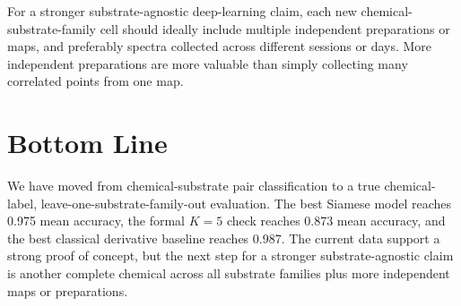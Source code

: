 \documentclass[11pt]{article}
\begin{document}
For a stronger substrate-agnostic deep-learning claim, each new chemical-substrate-family cell should ideally include multiple independent preparations or maps, and preferably spectra collected across different sessions or days. More independent preparations are more valuable than simply collecting many correlated points from one map.

\section*{Bottom Line}

We have moved from chemical-substrate pair classification to a true chemical-label, leave-one-substrate-family-out evaluation. The best Siamese model reaches 0.975 mean accuracy, the formal $K=5$ check reaches 0.873 mean accuracy, and the best classical derivative baseline reaches 0.987. The current data support a strong proof of concept, but the next step for a stronger substrate-agnostic claim is another complete chemical across all substrate families plus more independent maps or preparations.
\end{document}
